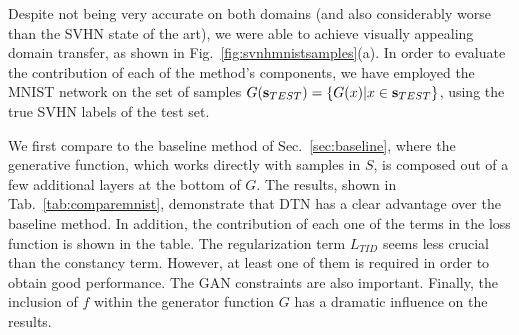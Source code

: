 \documentclass{article} %
\begin{document}
Despite not being very accurate on both domains (and also considerably worse than the SVHN state of the art), we were able to achieve visually appealing domain transfer, as shown in Fig.~\ref{fig:svnhmnistsamples}(a). In order to evaluate the contribution of each of the method's components, we have employed the MNIST network on the set of samples $G(\textbf s_{TEST})=\{G(x)|x\in \mathbf s_{TEST}\}$, using the true SVHN labels of the test set. 

We first compare to the baseline method of Sec.~\ref{sec:baseline}, where the generative function, which works directly with samples in $S$, is composed out of a few additional layers at the bottom of $G$. The results, shown in Tab.~\ref{tab:comparemnist}, demonstrate that DTN has a clear advantage over the baseline method. In addition, the contribution of each one of the terms in the loss function is shown in the table. The regularization term $L_{TID}$ seems less crucial than the constancy term. However, at least one of them is required in order to obtain good performance. The GAN constraints are also important. Finally, the inclusion of $f$ within the generator function $G$ has a dramatic influence on the results. 
\end{document}
